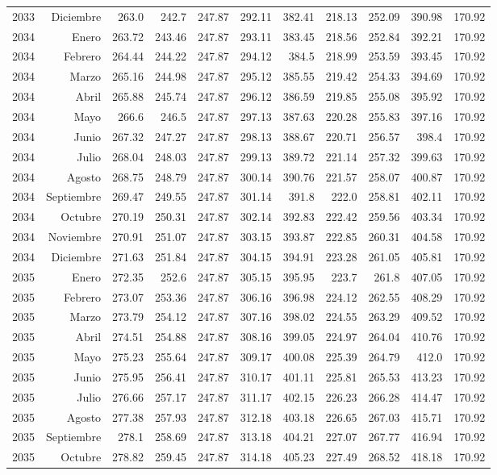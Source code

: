 \documentclass{article}%
\begin{document}
\begin{longtable}{|l r|r|r|r|r|r|r|r|r|r|}
2033&Diciembre&263.0&242.7&247.87&292.11&382.41&218.13&252.09&390.98&170.92\\%
2034&Enero&263.72&243.46&247.87&293.11&383.45&218.56&252.84&392.21&170.92\\%
2034&Febrero&264.44&244.22&247.87&294.12&384.5&218.99&253.59&393.45&170.92\\%
2034&Marzo&265.16&244.98&247.87&295.12&385.55&219.42&254.33&394.69&170.92\\%
2034&Abril&265.88&245.74&247.87&296.12&386.59&219.85&255.08&395.92&170.92\\%
2034&Mayo&266.6&246.5&247.87&297.13&387.63&220.28&255.83&397.16&170.92\\%
2034&Junio&267.32&247.27&247.87&298.13&388.67&220.71&256.57&398.4&170.92\\%
2034&Julio&268.04&248.03&247.87&299.13&389.72&221.14&257.32&399.63&170.92\\%
2034&Agosto&268.75&248.79&247.87&300.14&390.76&221.57&258.07&400.87&170.92\\%
2034&Septiembre&269.47&249.55&247.87&301.14&391.8&222.0&258.81&402.11&170.92\\%
2034&Octubre&270.19&250.31&247.87&302.14&392.83&222.42&259.56&403.34&170.92\\%
2034&Noviembre&270.91&251.07&247.87&303.15&393.87&222.85&260.31&404.58&170.92\\%
2034&Diciembre&271.63&251.84&247.87&304.15&394.91&223.28&261.05&405.81&170.92\\%
2035&Enero&272.35&252.6&247.87&305.15&395.95&223.7&261.8&407.05&170.92\\%
2035&Febrero&273.07&253.36&247.87&306.16&396.98&224.12&262.55&408.29&170.92\\%
2035&Marzo&273.79&254.12&247.87&307.16&398.02&224.55&263.29&409.52&170.92\\%
2035&Abril&274.51&254.88&247.87&308.16&399.05&224.97&264.04&410.76&170.92\\%
2035&Mayo&275.23&255.64&247.87&309.17&400.08&225.39&264.79&412.0&170.92\\%
2035&Junio&275.95&256.41&247.87&310.17&401.11&225.81&265.53&413.23&170.92\\%
2035&Julio&276.66&257.17&247.87&311.17&402.15&226.23&266.28&414.47&170.92\\%
2035&Agosto&277.38&257.93&247.87&312.18&403.18&226.65&267.03&415.71&170.92\\%
2035&Septiembre&278.1&258.69&247.87&313.18&404.21&227.07&267.77&416.94&170.92\\%
2035&Octubre&278.82&259.45&247.87&314.18&405.23&227.49&268.52&418.18&170.92\\%

\end{longtable}
\end{document}
